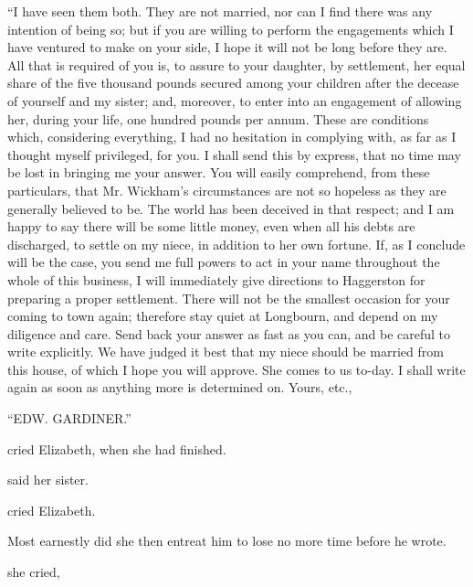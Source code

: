 “I have seen them both. They are not married, nor can I find there was any intention of being so; but if you are willing to perform the engagements which I have ventured to make on your side, I hope it will not be long before they are. All that is required of you is, to assure to your daughter, by settlement, her equal share of the five thousand pounds secured among your children after the decease of yourself and my sister; and, moreover, to enter into an engagement of allowing her, during your life, one hundred pounds per annum. These are conditions which, considering everything, I had no hesitation in complying with, as far as I thought myself privileged, for you. I shall send this by express, that no time may be lost in bringing me your answer. You will easily comprehend, from these particulars, that Mr. Wickham's circumstances are not so hopeless as they are generally believed to be. The world has been deceived in that respect; and I am happy to say there will be some little money, even when all his debts are discharged, to settle on my niece, in addition to her own fortune. If, as I conclude will be the case, you send me full powers to act in your name throughout the whole of this business, I will immediately give directions to Haggerston for preparing a proper settlement. There will not be the smallest occasion for your coming to town again; therefore stay quiet at Longbourn, and depend on my diligence and care. Send back your answer as fast as you can, and be careful to write explicitly. We have judged it best that my niece should be married from this house, of which I hope you will approve. She comes to us to-day. I shall write again as soon as anything more is determined on. Yours, etc.,

“EDW. GARDINER.”

 cried Elizabeth, when she had finished. 

 said her sister. 

 cried Elizabeth.


Most earnestly did she then entreat him to lose no more time before he wrote.

 she cried, 

